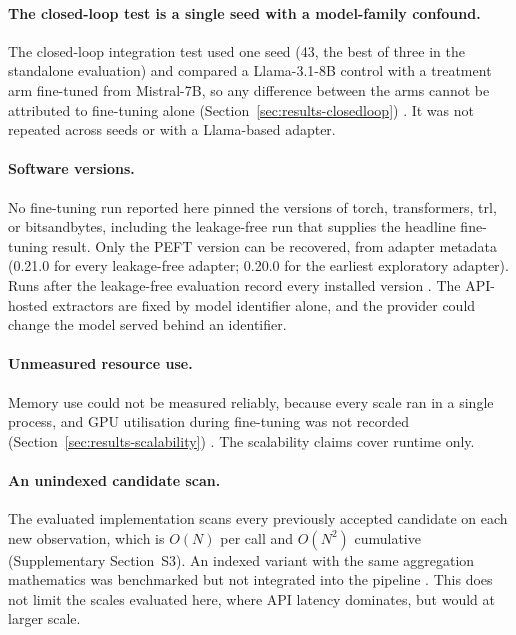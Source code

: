 \documentclass[11pt]{article}
\begin{document}
\paragraph{The closed-loop test is a single seed with a model-family
confound.} The closed-loop integration test used one seed (43, the best
of three in the standalone evaluation) and compared a Llama-3.1-8B
control with a treatment arm fine-tuned from Mistral-7B, so any
difference between the arms cannot be attributed to fine-tuning alone
(Section~\ref{sec:results-closedloop})
. It was not repeated across seeds or with a Llama-based adapter.


\paragraph{Software versions.} No fine-tuning run reported here
pinned the versions of torch, transformers, trl, or bitsandbytes,
including the leakage-free run that supplies the headline fine-tuning
result. Only the PEFT version can be recovered, from adapter metadata
(0.21.0 for every leakage-free adapter; 0.20.0 for the earliest
exploratory adapter). Runs after the leakage-free evaluation record
every installed version
. The API-hosted extractors are fixed by model identifier alone, and
the provider could change the model served behind an identifier.


\paragraph{Unmeasured resource use.} Memory use could not be measured
reliably, because every scale ran in a single process, and GPU
utilisation during fine-tuning was not recorded
(Section~\ref{sec:results-scalability})
. The scalability claims cover runtime only.

\paragraph{An unindexed candidate scan.} The evaluated implementation
scans every previously accepted candidate on each new observation,
which is $O(N)$ per call and $O(N^2)$ cumulative
(Supplementary Section~S3). An indexed variant with
the same aggregation mathematics was benchmarked but not integrated
into the pipeline
. This does not limit the scales evaluated here, where API latency
dominates, but would at larger scale.




\end{document}
